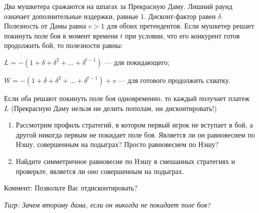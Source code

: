 \begin{problem}[Дуэль-1]
 Два мушкетера сражаются на шпагах за Прекрасную Даму. Лишний раунд
означает дополнительные издержки, равные 1. Дисконт-фактор равен $\delta$.
Полезность от Дамы равна $v>1$ для обоих претендентов. Если мушкетер
решает покинуть поле боя в момент времени $t$ при условии, что его
конкурент готов продолжить бой, то полезности равны: \par
$L=-(1+\delta+\delta^{2}+\ldots +\delta^{t-1})$ — для покидающего; \par
$W=-(1+\delta+\delta^{2}+\ldots +\delta^{t-1})+v$ — для готового
продолжить схватку. \par
Если оба решают покинуть поле боя одновременно, то каждый получает
платеж $L$ (Прекрасную Даму нельзя ни делить пополам, ни дисконтировать!) \par
\begin{enumerate}
\item  Рассмотрим профиль стратегий, в котором первый игрок не
вступает в бой, а другой никогда первым не покидает поле боя. Является ли
он равновесием по Нэшу, совершенным на подыграх? Просто равновесием
по Нэшу? \par
\item Найдите симметричное равновесие по Нэшу в смешанных стратегиях
и проверьте, является ли оно совершенным на подыграх.
\end{enumerate}
\begin{rem}
Коммент: Позвольте Вас отдисконтировать?

{\it Тигр: Зачем второму дама, если он никогда не покидает поле боя?}
\end{rem}


\begin{sol}

\end{sol}
\end{problem}




